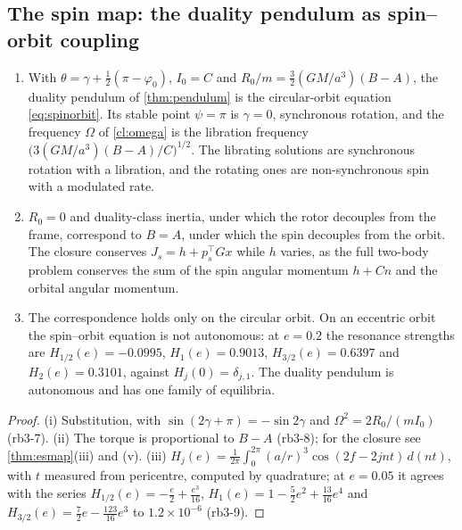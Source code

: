 \subsection{The spin map: the duality pendulum as spin--orbit coupling}
\label{sec:orbital:spin}

\begin{proposition}
\label{prop:spinmap}
\begin{enumerate}[label=(\roman*),leftmargin=2.2em]
\item With $\theta=\gamma+\tfrac12(\pi-\varphi_0)$, $I_0=C$ and $R_0/m=\tfrac32(GM/a^3)(B-A)$, the duality pendulum of \cref{thm:pendulum} is the
circular-orbit equation \eqref{eq:spinorbit}. Its stable point $\psi=\pi$ is $\gamma=0$, synchronous rotation, and the frequency $\Omega$ of
\cref{cl:omega} is the libration frequency $\bigl(3(GM/a^3)(B-A)/C\bigr)^{1/2}$. The librating solutions are synchronous rotation with a libration,
and the rotating ones are non-synchronous spin with a modulated rate.
\item $R_0=0$ and duality-class inertia, under which the rotor decouples from the frame, correspond to $B=A$, under which the spin decouples from
the orbit. The closure conserves $J_s=h+p_s^{\!\top}Gx$ while $h$ varies, as the full two-body problem conserves the sum of the spin angular
momentum $h+Cn$ and the orbital angular momentum.
\item The correspondence holds only on the circular orbit. On an eccentric orbit the spin--orbit equation is not autonomous: at $e=0.2$ the
resonance strengths are $H_{1/2}(e)=-0.0995$, $H_1(e)=0.9013$, $H_{3/2}(e)=0.6397$ and $H_2(e)=0.3101$, against $H_j(0)=\delta_{j,1}$. The
duality pendulum is autonomous and has one family of equilibria.
\end{enumerate}
\end{proposition}

\begin{proof}
(i) Substitution, with $\sin(2\gamma+\pi)=-\sin2\gamma$ and $\Omega^2=2R_0/(mI_0)$ (rb3-7). (ii) The torque is proportional to $B-A$ (rb3-8); for the
closure see \cref{thm:esmap}(iii) and (v). (iii)
$H_j(e)=\tfrac1{2\pi}\int_0^{2\pi}(a/r)^3\cos(2f-2jnt)\,d(nt)$, with $t$ measured from pericentre, computed by quadrature; at $e=0.05$ it
agrees with the series $H_{1/2}(e)=-\tfrac e2+\tfrac{e^3}{16}$, $H_1(e)=1-\tfrac52e^2+\tfrac{13}{16}e^4$ and $H_{3/2}(e)=\tfrac72e-\tfrac{123}{16}e^3$
to $1.2\times10^{-6}$ (rb3-9).
\end{proof}

